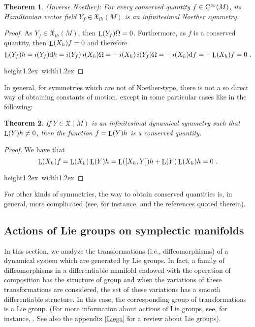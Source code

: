 \documentclass[12pt]{report}
\newtheorem{teor}{Theorem}[chapter]
\def\qed{\ifvmode\removelastskip\fi
{\unskip\nobreak\hfil\penalty50\hbox{}\nobreak\hfil
\hbox{\vrule height1.2ex width1.2ex}\parfillskip=0pt
\finalhyphendemerits=0 \par\smallskip}}
\def\vf{\mathfrak X}
\def\d{{\rm d}}
\def\Lie{\mathop{\rm L}\nolimits}
\def\inn{\mathop{i}\nolimits}
\def\Cinfty{{\rm C}^\infty}
\begin{document}
\begin{teor} {\rm (Inverse Noether)}:
\label{invNo}
For every conserved quantity $f\in\Cinfty(M)$, its Hamiltonian vector field
$Y_f\in\vf_{lh}(M)$ is an infinitesimal Noether symmetry.
\end{teor}
\begin{proof}
As $Y_f\in\vf_{lh}(M)$, then $\Lie(Y_f)\Omega=0$. Furthermore, as $f$
is a conserved quantity, then $\Lie(X_h)f=0$ and therefore
 $$
\Lie(Y_f) h=\inn(Y_f)\d h=\inn(Y_f)\inn(X_h)\Omega=
-\inn(X_h)\inn(Y_f)\Omega=-\inn(X_h)\d f=-\Lie(X_h)f=0 \ .
 $$
 \qed  \end{proof}

In general, for symmetries which are not of Noether-type,
there is not a so direct way of obtaining constants of motion, 
except in some particular cases like in the following:

\begin{teor}
\label{teo:biham}
If $Y\in\vf (M)$ is an infinitesimal dynamical symmetry such that
$\Lie(Y)h\not=0$, then the function
$f=\Lie(Y)h$ is a conserved quantity.
\end{teor}
\begin{proof}
We have that
$$
\Lie(X_h)f=\Lie(X_h)\Lie(Y)h=\Lie([X_h,Y])h+\Lie(Y)\Lie(X_h)h=0 \ .
$$
\qed  \end{proof}

For other kinds of symmetries, the way to obtain conserved quantities is, in general, more complicated (see, for instance, \cite{Cr-83,NRR-2018} and the references quoted therein).


\subsection{Actions of Lie groups on symplectic manifolds}
\label{cami1}


In this section, we analyze the transformations
(i.e., diffeomorphisms) of a dynamical system
which are generated by Lie groups.
In fact, a family of diffeomorphisms in a differentiable manifold
endowed with the operation of composition
has the structure of group and when the
variations of these transformations are considered, the set of
these variations has a smooth differentiable structure.
In this case, the corresponding group of transformations is a Lie group. 
(For more information about actions of Lie groups, see,
for instance, \cite{AM-78,Ar-89,CDW-87,CP-adg,Gi-hss,GGK-2002,LM-sgam,MSSV-85,Ok-87,So-ssd,Wa-fsmlg}.
See also the appendix \ref{Liega} for a review about Lie groups).
\end{document}
